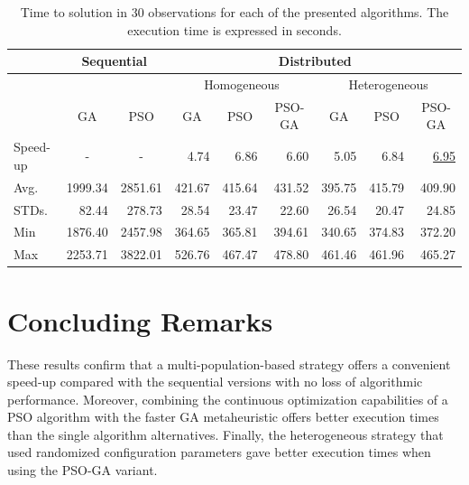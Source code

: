 \documentclass[runningheads]{llncs}
\begin{document}
\begin{table}[]
\caption{
  Time to solution in 30 observations for each of the
    presented algorithms. The execution time is expressed in seconds.
    }\label{tab:speedup}
\renewcommand*{\arraystretch}{1.4}
\setlength{\tabcolsep}{5pt}
    \begin{small}
\begin{tabular}{lrrrrrrrr}
    \hline
				&  \multicolumn{2}{c}{Sequential} & \multicolumn{6}{c}{Distributed} \\
    \hline
    & &    & \multicolumn{3}{c}{Homogeneous} & \multicolumn{3}{c}{Heterogeneous} \\
    \cline{4-6} \cline{7-9}
       & \multicolumn{1}{c}{GA} & \multicolumn{1}{c}{PSO} &\multicolumn{1}{c}{GA} & \multicolumn{1}{c}{PSO} & \multicolumn{1}{c}{PSO-GA} &\multicolumn{1}{c}{GA} & \multicolumn{1}{c}{PSO} & \multicolumn{1}{c}{PSO-GA}\\
    \hline
    Speed-up & \multicolumn{1}{c}{-} & \multicolumn{1}{c}{-} & 4.74 & 6.86 & 6.60 & 5.05 & 6.84 & \underline{6.95} \\
    \hline
Avg.   & 1999.34 & 2851.61 & 421.67 & 415.64 & 431.52 & 395.75 & 415.79 & 409.90 \\
    \hline
STDs.   & 82.44   & 278.73  & 28.54           & 23.47                    & 22.60           & 26.54           & 20.47           & 24.85    \\
    \hline
Min    & 1876.40 & 2457.98 & 364.65          & 365.81                   & 394.61          & 340.65          & 374.83          & 372.20   \\
    \hline
Max    & 2253.71 & 3822.01 & 526.76          & 467.47                   & 478.80          & 461.46          & 461.96          & 465.27  \\
    \hline
\end{tabular}
    \end{small}
\end{table}

\section{Concluding Remarks}

These results confirm that a multi-population-based strategy offers a convenient
speed-up compared with the sequential versions with no loss of algorithmic
performance.  Moreover, combining the continuous optimization capabilities of a
PSO algorithm with the faster GA metaheuristic offers better execution times
than the single algorithm alternatives.  Finally, the heterogeneous strategy
that used randomized configuration parameters gave better execution times when
using the PSO-GA variant.

%
%
%
%


%
\end{document}
